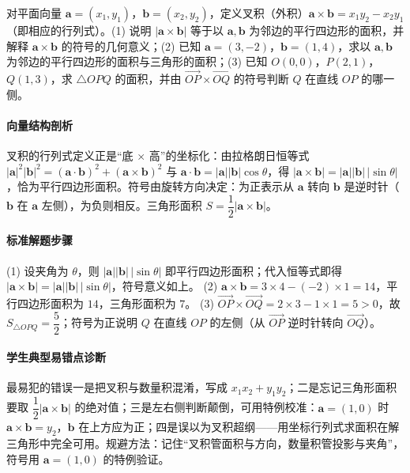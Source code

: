 \begin{problem}
对平面向量 $\bm a=(x_1,y_1)$，$\bm b=(x_2,y_2)$，定义叉积（外积）$\bm a\times\bm b=x_1y_2-x_2y_1$（即相应的行列式）。(1) 说明 $|\bm a\times\bm b|$ 等于以 $\bm a,\bm b$ 为邻边的平行四边形的面积，并解释 $\bm a\times\bm b$ 的符号的几何意义；(2) 已知 $\bm a=(3,-2)$，$\bm b=(1,4)$，求以 $\bm a,\bm b$ 为邻边的平行四边形的面积与三角形的面积；(3) 已知 $O(0,0)$，$P(2,1)$，$Q(1,3)$，求 $\triangle OPQ$ 的面积，并由 $\overrightarrow{OP}\times\overrightarrow{OQ}$ 的符号判断 $Q$ 在直线 $OP$ 的哪一侧。
\end{problem}
\begin{solution}
\paragraph{向量结构剖析}
叉积的行列式定义正是“底 $\times$ 高”的坐标化：由拉格朗日恒等式 $|\bm a|^2|\bm b|^2=(\bm a\cdot\bm b)^2+(\bm a\times\bm b)^2$ 与 $\bm a\cdot\bm b=|\bm a||\bm b|\cos\theta$，得 $|\bm a\times\bm b|=|\bm a||\bm b|\,|\sin\theta|$，恰为平行四边形面积。符号由旋转方向决定：为正表示从 $\bm a$ 转向 $\bm b$ 是逆时针（$\bm b$ 在 $\bm a$ 左侧），为负则相反。三角形面积 $S=\dfrac12|\bm a\times\bm b|$。
\paragraph{标准解题步骤}
(1) 设夹角为 $\theta$，则 $|\bm a||\bm b|\,|\sin\theta|$ 即平行四边形面积；代入恒等式即得 $|\bm a\times\bm b|=|\bm a||\bm b|\,|\sin\theta|$，符号意义如上。
(2) $\bm a\times\bm b=3\times4-(-2)\times1=14$，平行四边形面积为 $14$，三角形面积为 $7$。
(3) $\overrightarrow{OP}\times\overrightarrow{OQ}=2\times3-1\times1=5>0$，故 $S_{\triangle OPQ}=\dfrac52$；符号为正说明 $Q$ 在直线 $OP$ 的左侧（从 $\overrightarrow{OP}$ 逆时针转向 $\overrightarrow{OQ}$）。
\paragraph{学生典型易错点诊断}
最易犯的错误一是把叉积与数量积混淆，写成 $x_1x_2+y_1y_2$；二是忘记三角形面积要取 $\dfrac12|\bm a\times\bm b|$ 的绝对值；三是左右侧判断颠倒，可用特例校准：$\bm a=(1,0)$ 时 $\bm a\times\bm b=y_2$，$\bm b$ 在上方应为正；四是误以为叉积超纲——用坐标行列式求面积在解三角形中完全可用。规避方法：记住“叉积管面积与方向，数量积管投影与夹角”，符号用 $\bm a=(1,0)$ 的特例验证。
\end{solution}

